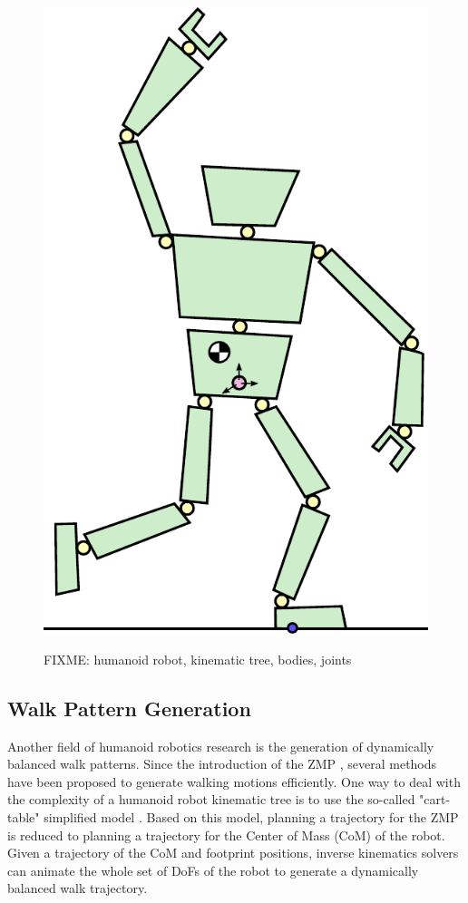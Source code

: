 \begin{figure}
  \centering
      {\includegraphics[width = 0.6\linewidth]
        {src/robot.pdf}}
      \caption{FIXME: humanoid robot, kinematic tree, bodies, joints}
      \label{fig:chap1-robot}
\end{figure}

\subsection{Walk Pattern Generation}
\label{subsec:chap1-pattern-generator}

Another field of humanoid robotics research is the generation of
dynamically balanced walk patterns. Since the introduction of the ZMP
\cite{vukobratovic1969contribution}, several methods have been
proposed to generate walking motions efficiently.  One way to deal
with the complexity of a humanoid robot kinematic tree is to use the
so-called "cart-table" simplified model \cite{kaji03}. Based
on this model, planning a trajectory for the ZMP is reduced to
planning a trajectory for the Center of Mass (CoM) of the robot.
Given a trajectory of the CoM and footprint positions, inverse
kinematics solvers can animate the whole set of DoFs of the robot to
generate a dynamically balanced walk trajectory.

